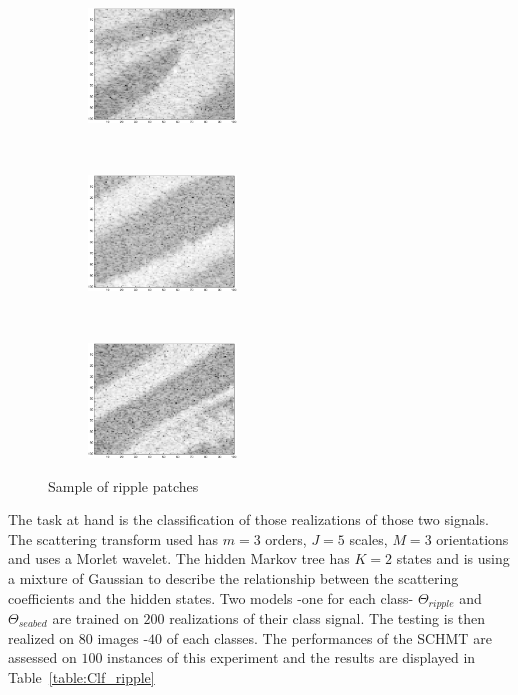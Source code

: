 \documentclass[a4paper,11pt]{report}
\begin{document}
		
		\begin{figure}[t!]
			\centering
			\begin{subfigure}[t]{0.5\textwidth}
				\centering
				\includegraphics[height=1.2in]{patch_ripple.eps}
			\end{subfigure}%
			~ 
			\begin{subfigure}[t]{0.5\textwidth}
        \centering
        \includegraphics[height=1.2in]{patch_ripple_2.eps}
			\end{subfigure}
			~
			\begin{subfigure}[t]{0.5\textwidth}
        \centering
        \includegraphics[height=1.2in]{patch_ripple_3.eps}
			\end{subfigure}
			\caption{Sample of ripple patches}
			\label{fig:Ripple patch}
		\end{figure}
		
		The task at hand is the classification of those realizations of those two signals. The scattering transform used has $m=3$ orders, $J=5$ scales, $M=3$ orientations and uses a Morlet wavelet. The hidden Markov tree has $K=2$ states and is using a mixture of Gaussian to describe the relationship between the scattering coefficients and the hidden states. Two models -one for each class- $\Theta_{ripple}$ and $\Theta_{seabed}$ are trained on $200$ realizations of their class signal. The testing is then realized on $80$ images -$40$ of each classes. The performances of the SCHMT are assessed on $100$ instances of this experiment and the results are displayed in Table~\ref{table:Clf_ripple}\\
		
\end{document}
